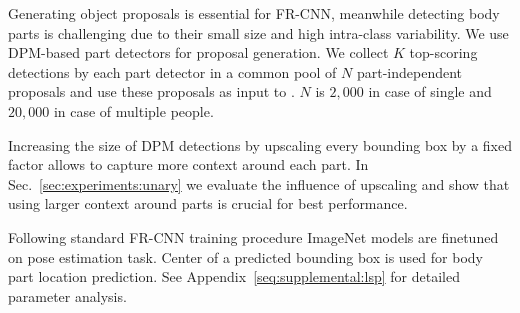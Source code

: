  Generating object proposals is
essential for FR-CNN, meanwhile detecting body parts is challenging
due to their small size and high intra-class variability.
We use DPM-based part detectors \cite{pishchulin13iccv} for proposal
generation.
We collect $K$ top-scoring detections by each part detector in a
common pool of $N$ part-independent proposals and use these proposals as
input to \rcnn. $N$ is $2,000$ in case of single and $20,000$ in case
of multiple people.

 Increasing the size of DPM detections by
upscaling every bounding box by a fixed factor allows to capture more
context around each part. In Sec.~\ref{sec:experiments:unary} we
evaluate the influence of upscaling and show that using larger context
around parts is crucial for best performance.

 Following standard FR-CNN training procedure
ImageNet models are finetuned on pose estimation task.
Center of a predicted bounding box is used for body part location
prediction. See Appendix~\ref{seq:supplemental:lsp} for detailed parameter analysis.



